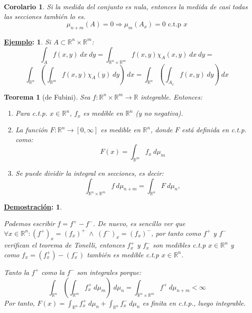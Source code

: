 \documentclass[10pt,a4paper,openright]{book}
\theoremstyle{break}
\newtheorem*{theo}{Teorema}
\newtheorem*{coro}{Corolario}
\newtheorem*{demo}{\underline{Demostración}:}
\newtheorem*{ej}{\underline{Ejemplo}:}
\newcommand{\dif}[1]{\ d#1}
\begin{document}
\begin{coro}
Si la medida del conjunto es nula, entonces la medida de casi todas las secciones también lo es.
$$\mu_{n + m} \left(A\right) = 0 \Rightarrow \mu_m \left(A_x\right) = 0 \text{ c.t.p } x$$
\end{coro}

\begin{ej} 
Si $A \subset \mathbb{R}^n \times \mathbb{R}^m$:
$$\int_A f \left(x, y\right) \dif{x} \dif{y} = \int_{\mathbb{R}^n \times \mathbb{R}^m} f \left(x, y\right) \chi_A \left(x, y\right) \dif{x}\dif{y} = $$
$$\int_{\mathbb{R}^n} \left(\int_{\mathbb{R}^m} f \left(x, y\right) \chi_A \left(y\right) \dif{y} \right) \dif{x} = \int_{\mathbb{R}^n} \left(\int_{A_x} f \left(x, y\right) \dif{y}\right) \dif{x}$$
\end{ej}

\begin{theo}[de Fubini]
Sea $f: \mathbb{R}^n \times \mathbb{R}^m \rightarrow \mathbb{R}$ integrable. Entonces: 
\begin{enumerate}
\item Para c.t.p. $x \in \mathbb{R}^n$, $f_x$ es medible en $\mathbb{R}^n$ (y no negativa).
\item La función $F: \mathbb{R}^n \rightarrow \left[0, \infty\right]$ es medible en $\mathbb{R}^n$, donde $F$ está definida en c.t.p. como:
$$F \left(x\right) = \int_{\mathbb{R}^m} f_x \dif{\mu}_m$$

\item Se puede dividir la integral en secciones, es decir:
$$\int_{\mathbb{R}^n \times \mathbb{R}^m} f \dif{\mu}_{n+m} = \int_{\mathbb{R}^n} F \dif{\mu}_n,$$
\end{enumerate}
\end{theo}
\begin{demo}
\begin{enumerate}
Podemos escribir $f = f^+ - f^-$. De nuevo, es sencillo ver que $\forall x \in \mathbb{R}^n : \left(f^+\right)_x = \left(f_x\right)^+ \; \land \; \left(f^-\right)_x = \left(f_x\right)^-$, por tanto como $f^+$ y $f^-$ verifican el teorema de Tonelli, entonces $f^+_x $ y $f^-_x$ son medibles c.t.p $x \in \mathbb{R}^n$ y como $f_x = \left(f^+_x\right) - \left(f^-_x\right)$ también es medible c.t.p $x \in \mathbb{R}^n$.

Tanto la $f^+$ como la $f^-$ son integrales porque:
 $$\int_{\mathbb{R}^n} \left(\int_{\mathbb{R}^m} f^+_x \dif{\mu_m} \right) \dif{\mu_n} = \int_{\mathbb{R}^n \times \mathbb{R}^m} f^+ \dif{\mu_{n+m}} < \infty$$
Por tanto, $F \left(x\right) = \int_{\mathbb{R}^n} f^+_x \dif{\mu_n} + \int_{\mathbb{R}^n} f^-_x \dif{\mu_n}$ es finita en c.t.p., luego integrable.
\end{enumerate}
\end{demo}
\end{document}
